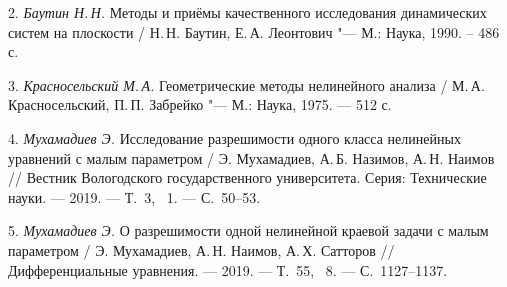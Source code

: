 2. {\it Баутин Н.\,Н. }
Методы и приёмы качественного исследования динамических систем на
плоскости / Н.\,Н. Баутин, Е.\,А. Леонтович "--- М.: Наука, 1990.
-- 486 с.

3. {\it Красносельский М.\,А. }
Геометрические методы нелинейного анализа / М.\,А. Красносельский,
П.\,П. Забрейко "--- М.: Наука, 1975. --- 512 с.

4. {\it Мухамадиев Э. }
Исследование разрешимости одного класса нелинейных уравнений с
малым параметром  / Э. Мухамадиев, А.\,Б. Назимов, А.\,Н. Наимов
// Вестник Вологодского государственного университета. Серия:
Технические науки. --- 2019. --- Т.~3, \No~1. --- С.~50--53.

5. {\it Мухамадиев Э. }
О разрешимости одной нелинейной краевой задачи с малым параметром
/ Э. Мухамадиев, А.\,Н. Наимов, А.\,Х. Сатторов
// Дифференциальные уравнения. --- 2019. --- Т.~55, \No~8. --- С.~1127--1137.
